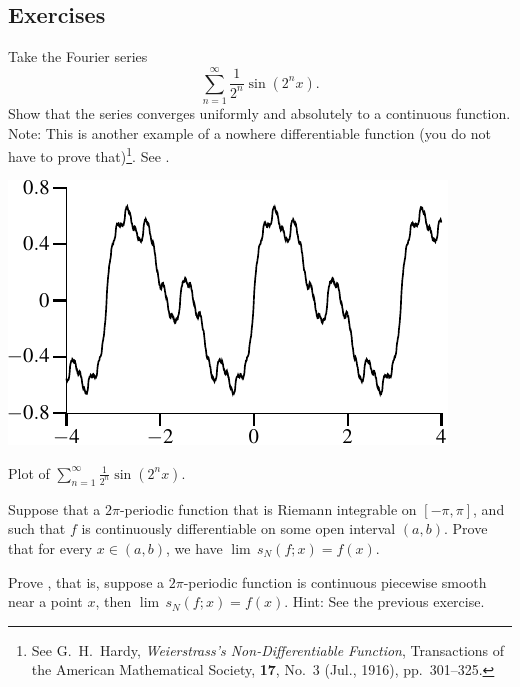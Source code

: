 \subsection{Exercises}

\begin{exercise}
Take the Fourier series
\begin{equation*}
\sum_{n=1}^\infty \frac{1}{2^n} \sin(2^n x) .
\end{equation*}
Show that the series converges uniformly and absolutely to a continuous
function.  Note: This is another example of a nowhere differentiable
function (you do not have to prove that)\footnote{%
See
G.\ H.\ Hardy, \emph{Weierstrass's Non-Differentiable Function},
Transactions of the American Mathematical Society,
\textbf{17}, No.\ 3 (Jul., 1916), pp.\ 301--325.}.
See .
\end{exercise}

\begin{myfigureht}
\includegraphics{figures/fourierserweier}
\caption{Plot of 
$\sum_{n=1}^\infty \frac{1}{2^n} \sin(2^n x)$.\label{fig:fourierserweier}}
\end{myfigureht}

\begin{exercise}
Suppose that a $2\pi$-periodic function that is Riemann integrable
on $[-\pi,\pi]$, and such that $f$ is continuously differentiable
on some open interval $(a,b)$.  Prove that
for every $x \in (a,b)$, we have $\lim\, s_N(f;x) = f(x)$.
\end{exercise}

\begin{exercise}
Prove , that is,
suppose a $2\pi$-periodic function is continuous piecewise
smooth near a point $x$, then $\lim\, s_N(f;x) = f(x)$.  Hint: See the previous
exercise.
\end{exercise}

